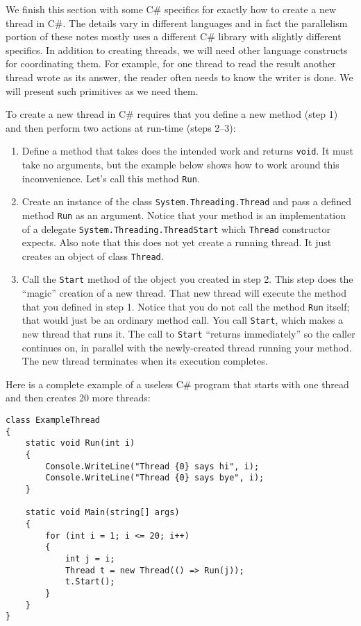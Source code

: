\documentclass[10pt]{article}
\begin{document}
We finish this section with some C\# specifics for exactly how to
create a new thread in C\#.  The details vary in different languages
and in fact the parallelism portion of these notes mostly uses a
different C\# library with slightly different specifics.  In addition
to creating threads, we will need other language constructs for
coordinating them.  For example, for one thread to read the result
another thread wrote as its answer, the reader often needs to know the
writer is done.  We will present such primitives as we need them.

To create a new thread in C\# requires that you define a new method
(step 1) and then perform two actions at run-time (steps 2--3):
\begin{enumerate}
\item Define a method that takes does the intended work and returns
  {\tt void}. It must take no arguments, but the example below shows
  how to work around this inconvenience. Let's call this method {\tt Run}.
\item Create an instance of the class {\tt System.Threading.Thread} and
  pass a defined method {\tt Run} as an argument. Notice that your method
  is an implementation of a delegate {\tt System.Threading.ThreadStart}
  which {\tt Thread} constructor expects. Also note that this does not
  yet create a running thread. It just creates an object of class {\tt Thread}. 
\item Call the {\tt Start} method of the object you created in step 2. This
  step does the “magic” creation of a new thread. That new thread will
  execute the method that you defined in step 1. Notice that you do not
  call the method {\tt Run} itself; that would just be an ordinary method
  call. You call {\tt Start}, which makes a new thread that runs it.
  The call to {\tt Start} “returns immediately” so the caller continues
  on, in parallel with the newly-created thread running your method.
  The new thread terminates when its execution completes.
\end{enumerate}
Here is a complete example of a useless C\# program that starts with one
thread and then creates 20 more threads:
\begin{verbatim}
class ExampleThread
{
    static void Run(int i)
    {
        Console.WriteLine("Thread {0} says hi", i);
        Console.WriteLine("Thread {0} says bye", i);
    }

    static void Main(string[] args)
    {
        for (int i = 1; i <= 20; i++)
        {
            int j = i;
            Thread t = new Thread(() => Run(j));
            t.Start();
        }
    }
}
\end{verbatim}
\end{document}

